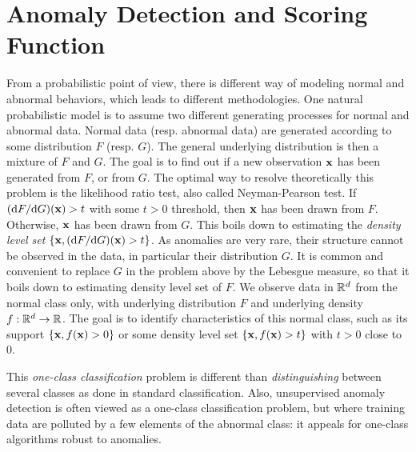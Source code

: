\section{Anomaly Detection and Scoring Function}
\label{resume:scoring_function}
From a probabilistic point of view, there is different way of modeling normal and abnormal behaviors, which leads to different methodologies. One natural probabilistic model is to assume two different generating processes for normal and abnormal data. Normal data (resp. abnormal data) are generated according to some distribution $F$ (resp. $G$). The general underlying distribution is then a mixture of $F$ and $G$. The goal is to find out if a new observation $\mathbf x$ has been generated from $F$, or from $G$. The optimal way to resolve theoretically this problem is the likelihood ratio test, also called Neyman-Pearson test. If $(\mathrm{d}  F / \mathrm{d}  G) ( \mathbf x) > t$ with some $t>0$ threshold, then $\mathbf x$ has been drawn from $F$. Otherwise, $\mathbf x$ has been drawn from $G$. This boils down to estimating the \emph{density level set} $\{\mathbf x, (\mathrm{d} F / \mathrm{d}  G) (\mathbf x) > t\}$.
%
As anomalies are very rare, their structure cannot be observed in the data, in particular their distribution $G$. 
%
It is common and convenient to replace $G$ in the problem above by the Lebesgue measure, so that it boils down to estimating density level set of $F$. %
We observe data in $\mathbb{R}^d$ from the normal class only, with underlying distribution $F$ and underlying density $f: \mathbb{R}^d \to \mathbb{R}$. 
The goal is to identify characteristics of this normal class, such as its support $\{\mathbf x, f( \mathbf x) > 0\}$ or some density level set $\{\mathbf x, f( \mathbf x) > t\}$ with $t>0$ close to $0$.

This \emph{one-class classification} problem is different than \emph{distinguishing} between several classes as done in standard classification. Also, unsupervised anomaly detection is often viewed as a one-class classification problem, but where training data are polluted by a few elements of the abnormal class: it appeals for one-class algorithms robust to anomalies. 





